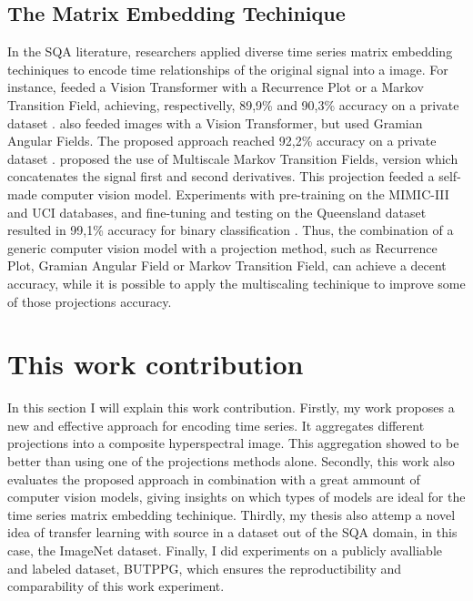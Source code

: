 \subsection{The Matrix Embedding Techinique}
\label{sec:matrix}

In the \acrshort{SQA} literature, researchers applied diverse time series matrix embedding techiniques to encode time relationships of the original signal into a image. For instance, \citeauthor{review-16} feeded a Vision Transformer with a Recurrence Plot or a Markov Transition Field, achieving, respectivelly, 89,9\% and 90,3\% accuracy on a private dataset \cite{review-16}. \citeauthor{review-17} also feeded images with a Vision Transformer, but used Gramian Angular Fields. The proposed approach reached 92,2\% accuracy on a private dataset \cite{review-17}. \citeauthor{review-18} proposed the use of Multiscale Markov Transition Fields, version which concatenates the signal first and second derivatives. This projection feeded a self-made computer vision model. Experiments with pre-training on the MIMIC-III and UCI databases, and fine-tuning and testing on the Queensland dataset resulted in 99,1\% accuracy for binary classification \cite{review-18}. Thus, the combination of a generic computer vision model with a projection method, such as Recurrence Plot, Gramian Angular Field or Markov Transition Field, can achieve a decent accuracy, while it is possible to apply the multiscaling techinique to improve some of those projections accuracy. 

\section{This work contribution}
\label{sec:my_work}

In this section I will explain this work contribution. Firstly, my work proposes a new and effective approach for encoding time series. It aggregates different projections into a composite hyperspectral image. This aggregation showed to be better than using one of the projections methods alone. Secondly, this work also evaluates the proposed approach in combination with a great ammount of computer vision models, giving insights on which types of models are ideal for the time series matrix embedding techinique. Thirdly, my thesis also attemp a novel idea of transfer learning with source in a dataset out of the \acrshort{SQA} domain, in this case, the ImageNet dataset. Finally, I did experiments on a  publicly avalliable and labeled dataset, \acrfull{BUTPPG}, which ensures the reproductibility and comparability of this work experiment.  
